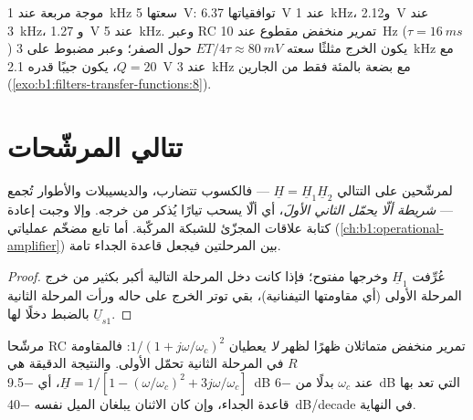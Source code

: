 \begin{example}[أعداد]\label{ex:b1:filters-transfer-functions:numbers}
موجة مربعة عند \qty{1}{kHz} سعتها \qty{5}{V}: توافقياتها
\qty{6.37}{V} عند \qty{1}{kHz}، و\qty{2.12}{V} عند \qty{3}{kHz}، و
\qty{1.27}{V} عند \qty{5}{kHz}. وعبر  RC تمرير منخفض مقطوع عند
\qty{10}{Hz} ($\tau = \qty{16}{ms}$) يكون الخرج مثلثًا سعته
$ET/4\tau \approx \qty{80}{mV}$ حول الصفر؛ وعبر
 مضبوط على \qty{3}{kHz} مع $Q = 20$، يكون جيبًا قدره \qty{2.1}{V}
عند \qty{3}{kHz} مع بضعة بالمئة فقط من الجارين
(\cref{exo:b1:filters-transfer-functions:8}).
\end{example}

\section{تتالي المرشّحات}

\begin{proposition}\label{prop:b1:filters-transfer-functions:cascade}
لمرشّحين على التتالي $\underline H = \underline H_1\underline H_2$
--- فالكسوب تتضارب، والديسيبلات والأطوار تُجمع --- \emph{شريطة ألّا يحمّل الثاني
الأولَ}، أي ألّا يسحب تيارًا يُذكر من
خرجه. وإلا وجبت إعادة كتابة علاقات المجزّئ للشبكة
المركّبة. أما تابع مضخّم عملياتي
(\cref{ch:b1:operational-amplifier}) بين المرحلتين فيجعل قاعدة الجداء
تامة.
\end{proposition}

\begin{proof}
عُرِّفت $\underline H_1$ وخرجها مفتوح؛ فإذا كانت  دخل
المرحلة التالية أكبر بكثير من  خرج المرحلة الأولى
(أي مقاومتها التيفنانية)، بقي توتر الخرج على حاله ورأت
المرحلة الثانية $\underline U_{s1}$ بالضبط دخلًا لها.
\end{proof}

\begin{example}[مرحلتا RC]\label{ex:b1:filters-transfer-functions:tworc}
مرشّحا RC تمرير منخفض متماثلان ظهرًا لظهر \emph{لا} يعطيان
$1/(1 + j\omega/\omega_c)^2$: فالمقاومة $R$ في المرحلة الثانية تحمّل الأولى.
والنتيجة الدقيقة هي $\underline H = 1/[1 - (\omega/\omega_c)^2 +
3j\omega/\omega_c]$، أي \qty{-9.5}{dB} عند $\omega_c$ بدلًا من
\qty{-6}{dB} التي تعد بها قاعدة الجداء، وإن كان الاثنان يبلغان الميل نفسه
\qty{-40}{dB/decade} في النهاية.
\end{example}

